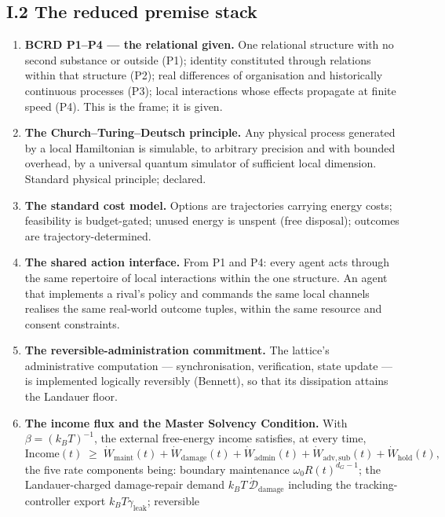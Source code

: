 \documentclass[
]{article}
\begin{document}
\subsection{I.2 The reduced premise
stack}\label{i.2-the-reduced-premise-stack}

\begin{enumerate}
\def\labelenumi{\arabic{enumi}.}
\item
  \textbf{BCRD P1--P4 --- the relational given.} One relational
  structure with no second substance or outside (P1); identity
  constituted through relations within that structure (P2); real
  differences of organisation and historically continuous processes
  (P3); local interactions whose effects propagate at finite speed (P4).
  This is the frame; it is given.
\item
  \textbf{The Church--Turing--Deutsch principle.} Any physical process
  generated by a local Hamiltonian is simulable, to arbitrary precision
  and with bounded overhead, by a universal quantum simulator of
  sufficient local dimension. Standard physical principle; declared.
\item
  \textbf{The standard cost model.} Options are trajectories carrying
  energy costs; feasibility is budget-gated; unused energy is unspent
  (free disposal); outcomes are trajectory-determined.
\item
  \textbf{The shared action interface.} From P1 and P4: every agent acts
  through the same repertoire of local interactions within the one
  structure. An agent that implements a rival's policy and commands the
  same local channels realises the same real-world outcome tuples,
  within the same resource and consent constraints.
\item
  \textbf{The reversible-administration commitment.} The lattice's
  administrative computation --- synchronisation, verification, state
  update --- is implemented logically reversibly (Bennett), so that its
  dissipation attains the Landauer floor.
\item
  \textbf{The income flux and the Master Solvency Condition.} With
  \(\beta=(k_BT)^{-1}\), the external free-energy income satisfies, at
  every time, \[
  \mathrm{Income}(t)\;\ge\;\dot W_{\mathrm{maint}}(t)+\dot W_{\mathrm{damage}}(t)+\dot W_{\mathrm{admin}}(t)+\dot W_{\mathrm{adv,sub}}(t)+\dot W_{\mathrm{hold}}(t),
  \] the five rate components being: boundary maintenance
  \(\omega_0R(t)^{d_G-1}\); the Landauer-charged damage-repair demand
  \(k_BT\,\dot{\mathcal D}_{\mathrm{damage}}\) including the
  tracking-controller export \(k_BT\gamma_{\mathrm{leak}}\); reversible

\end{enumerate}
\end{document}
